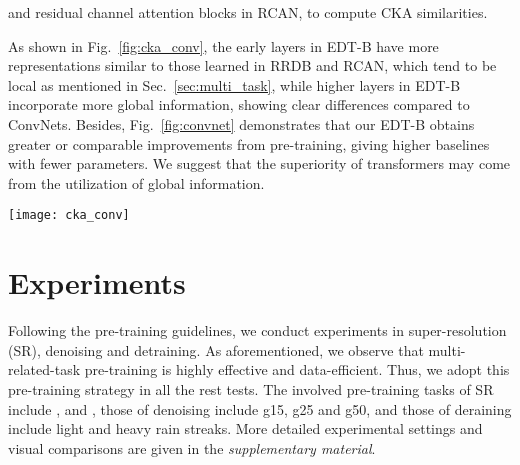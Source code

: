 \documentclass[runningheads]{llncs}
\begin{document}
	\begin{table}[h]
\begin{minipage}[c]{0.3\linewidth}
			\vspace{-0.1in}
			and residual channel attention blocks in RCAN, to compute CKA similarities.
			
			\setlength{\parindent}{2em}  As shown in Fig.~\ref{fig:cka_conv}, the early layers in EDT-B have more representations similar to those learned in RRDB and RCAN, which tend to be local as mentioned in Sec.~\ref{sec:multi_task}, while higher layers in EDT-B incorporate more global information, showing clear differences compared to ConvNets.  Besides, Fig.~\ref{fig:convnet} demonstrates that our EDT-B obtains greater or comparable improvements from pre-training, giving higher baselines with fewer parameters. We suggest that the superiority of transformers may come from the utilization of global information.
			
			
		\end{minipage}\hfill
		\begin{minipage}[c]{0.65\linewidth}
			\centering
			\texttt{[image: cka\_conv]}
 \label{fig:cka_conv}
		\end{minipage}
		\vspace{-0.1in}
	\end{table}
	
	\noindent  
	
	


	


	\section{Experiments}
	\label{sec:exps}
	Following the pre-training guidelines, we conduct experiments in super-resolution (SR), denoising and detraining. As aforementioned, we observe that multi-related-task pre-training is highly effective and data-efficient. Thus, we adopt this pre-training strategy in all the rest tests. The involved pre-training tasks of SR include ,  and , those of denoising include g15, g25 and g50, and those of deraining include light and heavy rain streaks. More detailed experimental settings and visual comparisons are given in the \textit{supplementary material}.  
	
\end{document}
